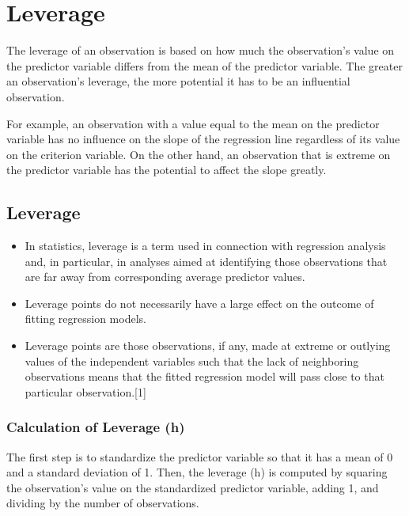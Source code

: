 \documentclass[residuals.tex]{subfiles}
\begin{document}
\newpage

\section{Leverage}
The leverage of an observation is based on how much the observation's value on the predictor variable differs from the 
mean of the predictor variable. The greater an observation's leverage, the more potential it has to be an influential observation. 

For example, an observation with a value equal to the mean on the predictor variable has no influence on the slope of the regression line regardless of its value on the criterion variable. On the other hand, an observation that is extreme on the predictor variable has the potential to affect the slope greatly.



\subsection{Leverage}
\begin{itemize}
\item In statistics, leverage is a term used in connection with regression analysis and, in particular, in analyses aimed at identifying those observations that are far away from corresponding average predictor values.

\item  Leverage points do not necessarily have a large effect on the outcome of fitting regression models.

\item Leverage points are those observations, if any, made at extreme or outlying values of the independent variables such that the lack of neighboring observations means that the fitted regression model will pass close to that particular observation.[1]


\end{itemize}
\subsubsection{Calculation of Leverage (h)}
The first step is to standardize the predictor variable so that it has a mean of 0 and a standard deviation of 1. Then, the leverage (h) is computed by squaring the observation's value on the standardized predictor variable, adding 1, and dividing by the number of observations.

\end{document}
